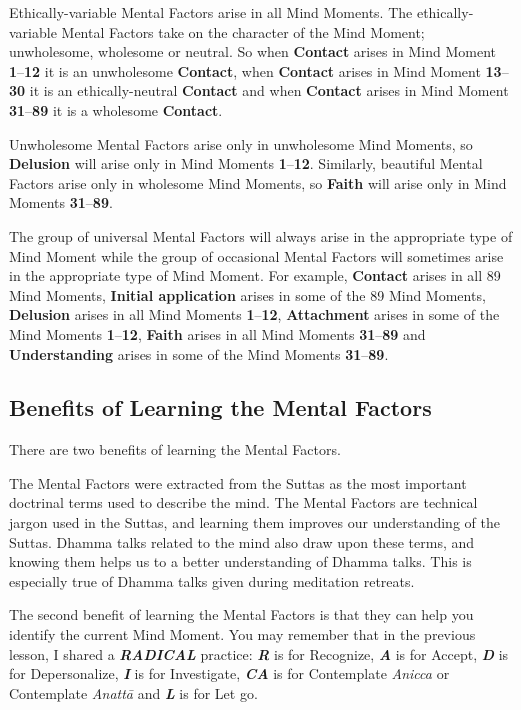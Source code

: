 Ethically-variable Mental Factors arise in all Mind Moments. The ethically-variable Mental Factors take on the character of the Mind Moment; unwholesome, wholesome or neutral. So when \textbf{Contact} arises in Mind Moment \textbf{1}--\textbf{12} it is an unwholesome \textbf{Contact}, when \textbf{Contact} arises in Mind Moment \textbf{13}--\textbf{30} it is an ethically-neutral \textbf{Contact} and when \textbf{Contact} arises in Mind Moment \textbf{31}--\textbf{89} it is a wholesome \textbf{Contact}.

Unwholesome Mental Factors arise only in unwholesome Mind Moments, so \textbf{Delusion} will arise only in Mind Moments \textbf{1}--\textbf{12}. Similarly, beautiful Mental Factors arise only in wholesome Mind Moments, so \textbf{Faith} will arise only in Mind Moments \textbf{31}--\textbf{89}.

The group of universal Mental Factors will always arise in the appropriate type of Mind Moment while the group of occasional Mental Factors will sometimes arise in the appropriate type of Mind Moment. For example, \textbf{Contact} arises in all 89 Mind Moments, \textbf{Initial application} arises in some of the 89 Mind Moments, \textbf{Delusion} arises in all Mind Moments \textbf{1}--\textbf{12}, \textbf{Attachment} arises in some of the Mind Moments \textbf{1}--\textbf{12}, \textbf{Faith} arises in all Mind Moments \textbf{31}--\textbf{89} and \textbf{Understanding} arises in some of the Mind Moments \textbf{31}--\textbf{89}. 

\pagebreak

\subsection*{Benefits of Learning the Mental Factors}

There are two benefits of learning the Mental Factors. 

The Mental Factors were extracted from the Suttas as the most important doctrinal terms used to describe the mind. The Mental Factors are technical jargon used in the Suttas, and learning them improves our understanding of the Suttas. Dhamma talks related to the mind also draw upon these terms, and knowing them helps us to a better understanding of Dhamma talks. This is especially true of Dhamma talks given during meditation retreats.

The second benefit of learning the Mental Factors is that they can help you identify the current Mind Moment. You may remember that in the previous lesson, I shared a \textbf{\textit{RADICAL}} practice: \textbf{\textit{R}} is for Recognize, \textbf{\textit{A}} is for Accept, \textbf{\textit{D}} is for Depersonalize, \textbf{\textit{I}} is for Investigate, \textbf{\textit{CA}} is for Contemplate \textit{Anicca} or Contemplate \textit{Anattā} and \textit{\textbf{L}} is for Let go. 

